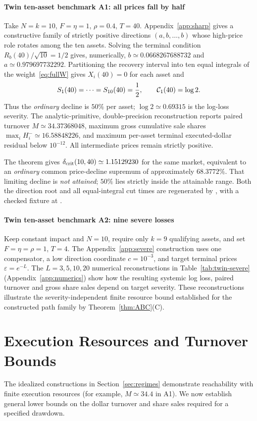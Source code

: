 \documentclass[review,hidelinks,onefignum,onetabnum]{siamonline250211}
\begin{document}
\paragraph{Twin ten-asset benchmark A1: all prices fall by half}
Take $N=k=10$, $F=\eta=1$, $\rho=0.4$, $T=40$.
Appendix~\ref{app:sharp} gives a constructive family of strictly
positive directions $(a,b,\ldots,b)$ whose high-price role rotates
among the ten assets. Solving the terminal condition
$R_b(40)/\sqrt{10}=1/2$ gives, numerically,
$b\simeq0.0668267688732$ and $a\simeq0.979697732292$.
Partitioning the recovery interval into ten equal
integrals of the weight~\eqref{eq:fullW} gives
$X_i(40)=0$ for each asset and
\[
S_1(40)=\cdots=S_{10}(40)=\frac12,\qquad
\mathcal{C}_1(40)=\log2.
\]
Thus the \emph{ordinary} decline is $50\%$ per asset;
$\log2\simeq0.69315$ is the log-loss severity. The
analytic-primitive, double-precision reconstruction reports
paired turnover $M\simeq34.37368048$, maximum gross
cumulative sale shares $\max_iH_i^-\simeq16.58848226$,
and maximum per-asset terminal executed-dollar residual
below $10^{-12}$. All intermediate prices remain strictly positive.

The theorem gives
$\delta_{\rm crit}(10,40)\simeq1.15129230$ for the same
market, equivalent to an \emph{ordinary} common price-decline
supremum of approximately $68.3772\%$. That limiting
decline is \emph{not attained}; $50\%$ lies strictly
inside the attainable range. Both the direction root
and all equal-integral cut times are regenerated by
,
with a checked fixture at
.

\paragraph{Twin ten-asset benchmark A2: nine severe losses}
Keep constant impact and $N=10$, require only $k=9$
qualifying assets, and set $F=\eta=\rho=1$, $T=4$.
The Appendix~\ref{app:severe} construction uses one
compensator, a low direction coordinate $c=10^{-3}$,
and target terminal prices $\varepsilon=e^{-L}$.
The $L=3,5,10,20$ numerical reconstructions in
Table~\ref{tab:twin-severe} (Appendix~\ref{app:numerics})
show how the resulting systemic log loss, paired
turnover and gross share sales depend on target severity.
These reconstructions illustrate the severity-independent
finite resource bound established for the constructed path
family by Theorem~\ref{thm:ABC}(C).

\section{Execution Resources and Turnover Bounds}\label{sec:budget}
The idealized constructions in Section~\ref{sec:regimes} demonstrate
reachability with finite execution resources (for example,
$M\simeq34.4$ in A1). We now establish general lower bounds on the
dollar turnover and share sales required for a specified drawdown.
\end{document}
